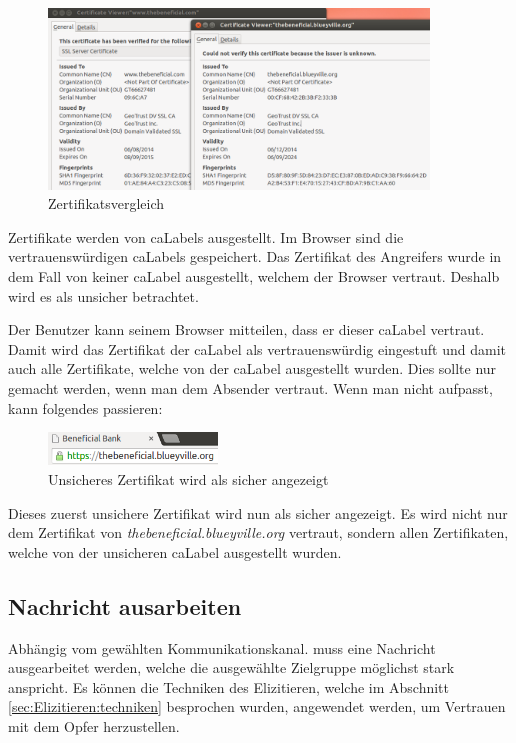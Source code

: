 \begin{figure}[H]
  \centering
  \includegraphics[width=0.9\textwidth]{images/https-certificate-comparision.png}
  \caption{Zertifikatsvergleich}
  \label{fig:phishing:angriffvorbereiten:angriffsvektoren:fakecertificates:certificatecomparison}
\end{figure}

Zertifikate werden von \Glspl{caLabel} ausgestellt. Im Browser sind die vertrauenswürdigen \Glspl{caLabel} gespeichert. Das Zertifikat des Angreifers wurde in dem Fall von keiner \Gls{caLabel} ausgestellt, welchem der Browser vertraut. Deshalb wird es als unsicher betrachtet.

Der Benutzer kann seinem Browser mitteilen, dass er dieser \Gls{caLabel} vertraut. Damit wird das Zertifikat der \Gls{caLabel} als vertrauenswürdig eingestuft und damit auch alle Zertifikate, welche von der \Gls{caLabel} ausgestellt wurden. Dies sollte nur gemacht werden, wenn man dem Absender vertraut. Wenn man nicht aufpasst, kann folgendes passieren:

\begin{figure}[H]
  \centering
  \includegraphics[width=0.4\textwidth]{images/https-chrome-falsesecure.png}
  \caption{Unsicheres Zertifikat wird als sicher angezeigt}
  \label{fig:phishing:angriffvorbereiten:angriffsvektoren:fakecertificates:chrome:falsesecure}
\end{figure}
Dieses zuerst unsichere Zertifikat wird nun als sicher angezeigt. Es wird nicht nur dem Zertifikat von \textit{thebeneficial.blueyville.org} vertraut, sondern allen Zertifikaten, welche von der unsicheren \Gls{caLabel} ausgestellt wurden.

\subsection{Nachricht ausarbeiten}
Abhängig vom gewählten Kommunikationskanal. muss eine Nachricht ausgearbeitet werden, welche die ausgewählte Zielgruppe möglichst stark anspricht.
Es können die Techniken des Elizitieren, welche im Abschnitt \ref{sec:Elizitieren:techniken} besprochen wurden, angewendet werden, um Vertrauen mit dem Opfer herzustellen.

